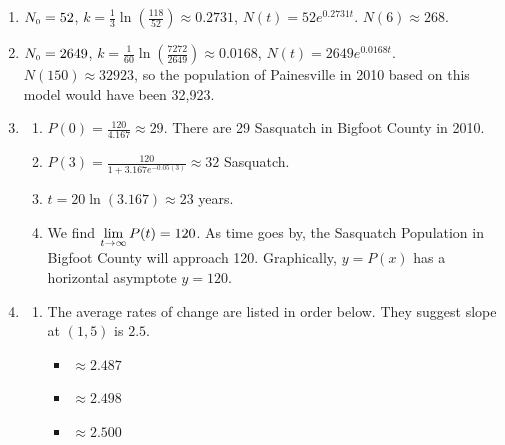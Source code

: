 \begin{enumerate}
\setcounter{enumi}{\value{HW}}


\item  $N_{\text{\tiny $0$}} = 52$,  $k = \frac{1}{3} \ln\left( \frac{118}{52}\right) \approx 0.2731$, $N(t) = 52e^{0.2731t}$.  $N(6) \approx 268$. 

\item  $N_{\text{\tiny $0$}} = 2649$,  $k = \frac{1}{60} \ln\left( \frac{7272}{2649}\right) \approx 0.0168$, $N(t) = 2649e^{0.0168t}$.  $N(150) \approx 32923$, so the population of Painesville in 2010 based on this model would have been 32,923.



\item  \begin{enumerate}  \item  $P(0) = \frac{120}{4.167} \approx 29$.  There are 29 Sasquatch in Bigfoot County in 2010.

\item  $P(3) = \frac{120}{1+3.167e^{-0.05(3)}} \approx 32$ Sasquatch.

\item  $t = 20 \ln(3.167) \approx 23$ years.

\item  We find $\displaystyle{\lim_{t \rightarrow \infty} P(t) =  120}$.  As time goes by, the Sasquatch Population in Bigfoot County will approach 120.  Graphically,  $y = P(x)$ has a horizontal asymptote $y=120$.

\end{enumerate}

\pagebreak

\item 

\begin{enumerate}

\addtocounter{enumii}{1}

\item The average rates of change are listed in order below. They suggest  slope at $(1,5)$ is $2.5$.  

\begin{multicols}{6}

\begin{itemize}

\item $\approx 2.487$

\item $\approx 2.498$

\item $\approx 2.500$


\end{itemize}
\end{multicols}
\end{enumerate}
\end{enumerate}
